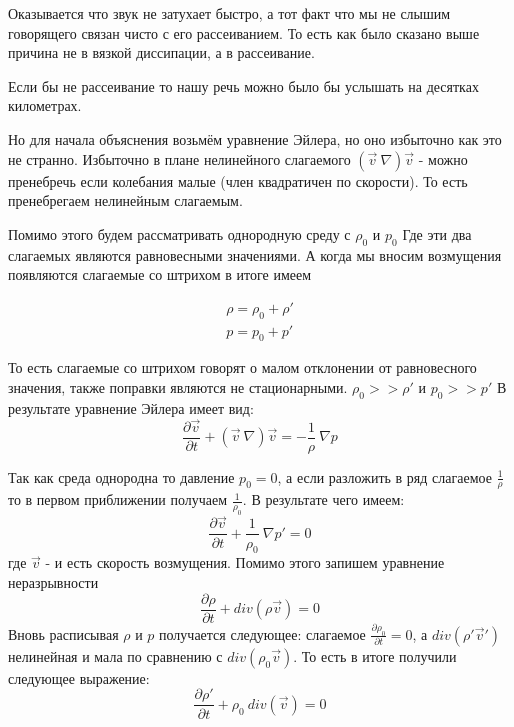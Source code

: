 \documentclass[14pt,a4paper,oneside]{extarticle}	%
\begin{document}
Оказывается что звук не затухает быстро, а тот факт что мы не слышим говорящего связан чисто с его рассеиванием.
То есть как было сказано выше причина не в вязкой диссипации, а в рассеивание.

 Если бы не рассеивание то нашу речь можно было бы услышать на десятках километрах.

 Но для начала объяснения возьмём уравнение Эйлера, но оно избыточно как это не странно.
 Избыточно в плане нелинейного слагаемого $ (\vec{v}\:\nabla)\vec{v} $ - можно пренебречь если колебания малые (член квадратичен по скорости).
 То есть пренебрегаем нелинейным слагаемым.

 Помимо этого будем рассматривать однородную среду с $ \rho_{0} $ и $ p_{0} $
 Где эти два слагаемых являются равновесными значениями.
 А когда мы вносим возмущения появляются слагаемые со штрихом в итоге имеем

\begin{eqnarray*}
\rho = \rho_{0} + \rho' \\
p = p_{0} + p'
\end{eqnarray*}


То есть слагаемые со штрихом говорят о малом отклонении от равновесного значения, также поправки являются не стационарными.
$ \rho_{0} >> \rho' $ и 
$ p_{0} >> p' $
В результате уравнение Эйлера имеет вид:
\begin{equation*}
\frac{\partial \vec{v}}{\partial t} + (\vec{v}\:\nabla)\vec{v} = -\frac{1}{\rho}\: \nabla p
\end{equation*}

Так как среда однородна то давление $ p_{0} = 0 $, а если разложить в ряд слагаемое $ \frac{1}{\rho} $ то в первом приближении получаем $ \frac{1}{\rho_{0}} $.
В результате чего имеем:
\begin{equation*}
\frac{\partial \vec{v}}{\partial t} + \frac{1}{\rho_{0}}\: \nabla p' = 0
\end{equation*}
где $ \vec{v} $ - и есть скорость возмущения.
Помимо этого запишем уравнение неразрывности 
\begin{equation*}
\frac{\partial \rho}{\partial t} + div( \rho \vec{v}) = 0
\end{equation*}
Вновь расписывая $ \rho $ и $ p $ получается следующее:
слагаемое $ \frac{\partial \rho_{0}}{\partial t} = 0 $, а $ div( \rho'\vec{v}') $ нелинейная и мала по сравнению с $ div( \rho_{0}\vec{v}) $. То есть в итоге получили следующее выражение:
\begin{equation*}
\frac{\partial \rho'}{\partial t} + \rho_{0}\: div(\vec{v}) = 0
\end{equation*}
\end{document}
